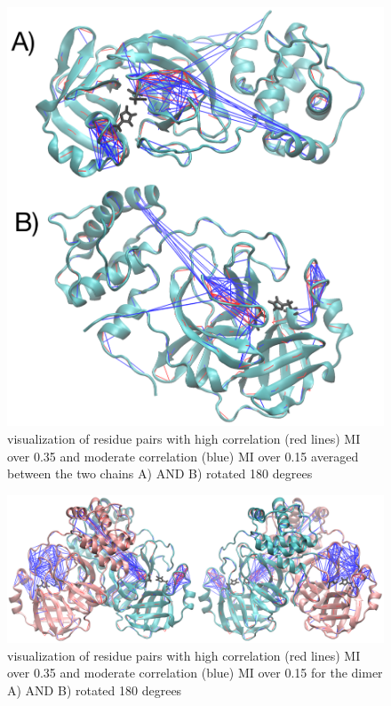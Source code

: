 \documentclass{biophys-new}
\begin{document}
\begin{figure}[ht]
\graphicspath{ {./supplemental_figures/} }
\centering
\includegraphics[width=0.6\linewidth]{Averaged_MI_image.pdf}
\caption{visualization of residue pairs with high correlation (red lines) MI over 0.35 and moderate correlation (blue) MI over 0.15 averaged between the two chains A) AND B) rotated 180 degrees}
\label{fig:view}
\end{figure}

\begin{figure}[ht]
\centering
\graphicspath{ {./supplemental_figures/} }
\includegraphics[width=0.6\linewidth]{dimer_MI_image.pdf}
\caption{visualization of residue pairs with high correlation (red lines) MI over 0.35 and moderate correlation (blue) MI over 0.15 for the dimer A) AND B) rotated 180 degrees}
\label{fig:view}
\end{figure}
\end{document}
